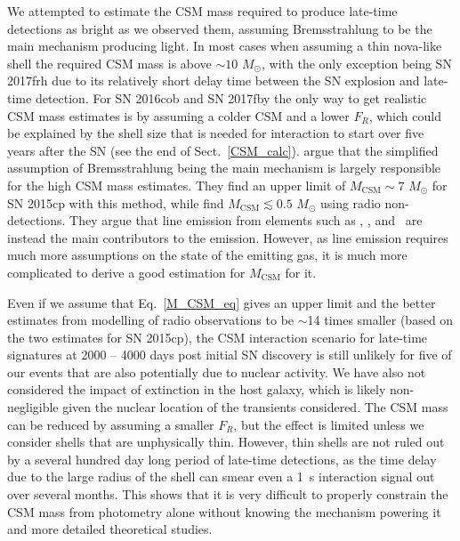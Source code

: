 \documentclass[a4paper,oneside,12pt, class=Latex/Classes/PhDthesisPSnPDF, crop=false]{standalone}
\begin{document}
We attempted to estimate the CSM mass required to produce late-time detections as bright as we observed them, assuming Bremsstrahlung to be the main mechanism producing light. In most cases when assuming a thin nova-like shell the required CSM mass is above $\sim 10$ $M_\odot$, with the only exception being SN 2017frh due to its relatively short delay time between the SN explosion and late-time detection. For SN 2016cob and SN 2017fby the only way to get realistic CSM mass estimates is by assuming a colder CSM and a lower $F_R$, which could be explained by the shell size that is needed for interaction to start over five years after the SN (see the end of Sect.~\ref{CSM_calc}). \citet{2015cp} argue that the simplified assumption of Bremsstrahlung being the main mechanism is largely responsible for the high CSM mass estimates. They find an upper limit of $M_\text{CSM} \sim 7$ $M_\odot$ for SN 2015cp with this method, while \citet{2015cp_radio} find $M_\text{CSM} \lesssim 0.5$ $M_\odot$ using radio non-detections. They argue that line emission from elements such as , , and ~are instead the main contributors to the emission. However, as line emission requires much more assumptions on the state of the emitting gas, it is much more complicated to derive a good estimation for $M_\text{CSM}$ for it. 

Even if we assume that Eq.~\ref{M_CSM_eq} gives an upper limit and the better estimates from modelling of radio observations to be $\sim$14 times smaller (based on the two estimates for SN 2015cp), the CSM interaction scenario for late-time signatures at 2000 -- 4000 days post initial SN discovery is still unlikely for five of our events that are also potentially due to nuclear activity. We have also not considered the impact of extinction in the host galaxy, which is likely non-negligible given the nuclear location of the transients considered. The CSM mass can be reduced by assuming a smaller $F_R$, but the effect is limited unless we consider shells that are unphysically thin. However, thin shells are not ruled out by a several hundred day long period of late-time detections, as the time delay due to the large radius of the shell can smear even a 1~s interaction signal out over several months. This shows that it is very difficult to properly constrain the CSM mass from photometry alone without knowing the mechanism powering it and more detailed theoretical studies.
\end{document}
